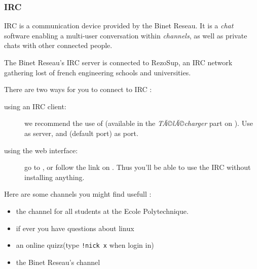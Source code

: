 
\subsubsection{IRC}

\label{irc}


IRC is a communication device provided by the Binet Reseau. It is a \emph{chat} software
enabling a multi-user conversation within \emph{channels}, as well as private chats with other connected people.

The Binet Reseau's IRC server is connected to RezoSup, an IRC network gathering lost of french engineering schools and universities.


There are two ways for you to connect to IRC :


\begin{description}
  \item[using an IRC client:] we recommend the use of  (available in the \emph{TÃ©lÃ©charger} part on  \fkz). Use  as server, and  (default port) as port.
  \item[using the web interface:] go to , or follow the link  on \fkz. Thus you'll be able to use the IRC without installing anything.
 \end{description}

Here are some channels you might find usefull :
 \begin{itemize}

  \item {} the channel for all students at the Ecole Polytechnique.
  \item {} if ever you have questions about linux
  \item {} an online quizz(type \texttt{!nick x} when login in)
  \item {} the Binet Reseau's channel
 \end{itemize}
